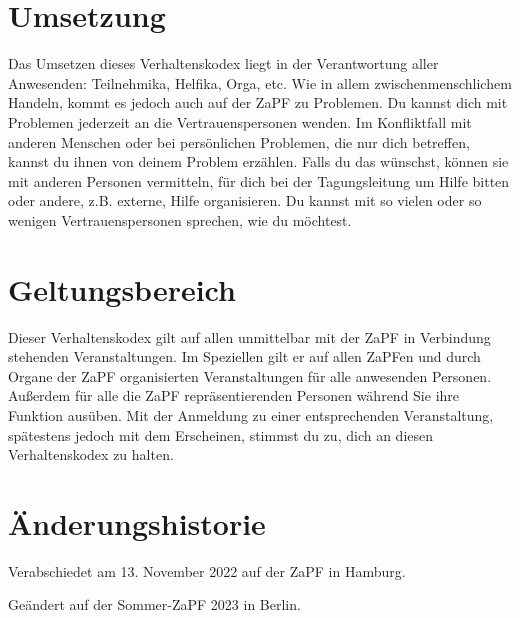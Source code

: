 \documentclass[
  a4paper,
  oneside]{scrartcl}
\begin{document}
\section{Umsetzung}\label{umsetzung}

Das Umsetzen dieses Verhaltenskodex liegt in der Verantwortung aller
Anwesenden: Teilnehmika, Helfika, Orga, etc. Wie in allem
zwischenmenschlichem Handeln, kommt es jedoch auch auf der ZaPF zu
Problemen. Du kannst dich mit Problemen jederzeit an die
Vertrauenspersonen wenden. Im Konfliktfall mit anderen Menschen oder bei
persönlichen Problemen, die nur dich betreffen, kannst du ihnen von
deinem Problem erzählen. Falls du das wünschst, können sie mit anderen
Personen vermitteln, für dich bei der Tagungsleitung um Hilfe bitten
oder andere, z.B. externe, Hilfe organisieren. Du kannst mit so vielen
oder so wenigen Vertrauenspersonen sprechen, wie du möchtest.

\section{Geltungsbereich}\label{geltungsbereich}

Dieser Verhaltenskodex gilt auf allen unmittelbar mit der ZaPF in
Verbindung stehenden Veranstaltungen. Im Speziellen gilt er auf allen
ZaPFen und durch Organe der ZaPF organisierten Veranstaltungen für alle
anwesenden Personen. Außerdem für alle die ZaPF repräsentierenden
Personen während Sie ihre Funktion ausüben. Mit der Anmeldung zu einer
entsprechenden Veranstaltung, spätestens jedoch mit dem Erscheinen,
stimmst du zu, dich an diesen Verhaltenskodex zu halten.

\section{Änderungshistorie}\label{uxe4nderungshistorie}

Verabschiedet am 13. November 2022 auf der ZaPF in Hamburg.

Geändert auf der Sommer-ZaPF 2023 in Berlin.
\end{document}
